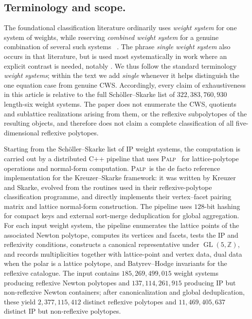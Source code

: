 \documentclass[appliedmath,article,submit,moreauthors]{Definitions/mdpi}
\newcommand{\Z}{\mathbb{Z}}
\newcommand{\GL}{\operatorname{GL}}
\newcommand{\PALP}{\textsc{Palp}}
\begin{document}
{\color{blue}
\subsection{Terminology and scope.}
The foundational classification literature ordinarily uses \emph{weight
system} for one system of weights, while reserving \emph{combined weight
system} for a genuine combination of several such systems
~\cite{KS97,KreuzerSkarke1998,KreuzerSkarke2000,Scholler2019}. The phrase
\emph{single weight system} also occurs in that literature, but is used most
systematically in work where an explicit contrast is needed, notably
\cite{Avram1997}. We thus follow the standard  terminology
\emph{weight systems}; within the text we add \emph{single} whenever it helps
distinguish the one equation case from genuine CWS. Accordingly, every claim
of exhaustiveness in this article is relative to the full Sch\"oller--Skarke
list of \(322{,}383{,}760{,}930\) length-six weight systems. The paper does not
enumerate the CWS, quotients and sublattice
realizations arising from them, or the reflexive subpolytopes of the resulting
objects, and therefore does not claim a complete classification of all
five-dimensional reflexive polytopes.
}

Starting from the Sch\"oller--Skarke list of IP weight systems, the computation
is carried out by a distributed C++ pipeline that uses
{\color{blue}\PALP~\cite{PALP,GrinisKasprzyk2013} for lattice-polytope
operations and normal-form computation. \PALP\ is the de facto reference
implementation for the Kreuzer--Skarke framework: it was written by Kreuzer
and Skarke, evolved from the routines used in their reflexive-polytope
classification programme, and directly implements their vertex--facet pairing
matrix and lattice normal-form construction.} The pipeline uses \(128\)-bit
hashing for compact keys and external sort-merge deduplication for global
aggregation. For
each input weight system, the pipeline enumerates the lattice points of the
associated Newton polytope, computes its vertices and facets, tests the IP and
reflexivity conditions, constructs a canonical representative under
\(\GL(5,\Z)\), and records multiplicities together with lattice-point and vertex
data, dual data when the polar is a lattice polytope, and Batyrev--Hodge
invariants for the reflexive catalogue. The input contains
\(185{,}269{,}499{,}015\) weight systems producing reflexive Newton polytopes
and \(137{,}114{,}261{,}915\) producing IP but non-reflexive Newton containers;
after canonicalization and global deduplication, these yield
\(2{,}377{,}115{,}412\) distinct reflexive polytopes and
\(11{,}469{,}405{,}637\) distinct IP but non-reflexive polytopes.
\end{document}
